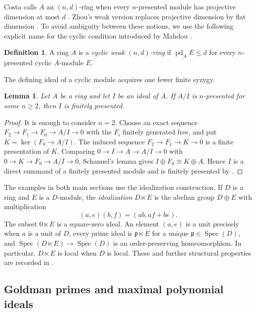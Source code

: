 \documentclass[11pt]{amsart}
\numberwithin{equation}{section}
\newtheorem{lemma}[theorem]{Lemma}
\theoremstyle{definition}
\newtheorem{definition}[theorem]{Definition}
\theoremstyle{remark}
\newcommand{\pd}{\operatorname{pd}}
\newcommand{\Spec}{\operatorname{Spec}}
\begin{document}
Costa calls $A$ an $(n,d)$-ring when every $n$-presented module has projective dimension at most $d$ \cite{Costa}.  Zhou's weak version replaces projective dimension by flat dimension \cite{Zhou}.  To avoid ambiguity between these notions, we use the following explicit name for the cyclic condition introduced by Mahdou \cite{Mahdou}.

\begin{definition}\label{def:cyclic-weak}
A ring $A$ is a \emph{cyclic weak $(n,d)$-ring} if $\pd_A E\leq d$ for every $n$-presented cyclic $A$-module $E$.
\end{definition}

The defining ideal of a cyclic module acquires one fewer finite syzygy.

\begin{lemma}\label{lem:cyclic-ideal}
Let $A$ be a ring and let $I$ be an ideal of $A$.  If $A/I$ is $n$-presented for some $n\geq2$, then $I$ is finitely presented.
\end{lemma}

\begin{proof}
It is enough to consider $n=2$.  Choose an exact sequence $F_2\to F_1\to F_0\to A/I\to0$ with the $F_i$ finitely generated free, and put $K=\ker(F_0\to A/I)$.  The induced sequence $F_2\to F_1\to K\to0$ is a finite presentation of $K$.  Comparing $0\to I\to A\to A/I\to0$ with $0\to K\to F_0\to A/I\to0$, Schanuel's lemma gives $I\oplus F_0\cong K\oplus A$.  Hence $I$ is a direct summand of a finitely presented module and is finitely presented by \cite[Theorem 2.6.5]{WK24}.
\end{proof}

The examples in both main sections use the idealization construction.  If $D$ is a ring and $E$ is a $D$-module, the \emph{idealization} $D\ltimes E$ is the abelian group $D\oplus E$ with multiplication
\[
 (a,e)(b,f)=(ab,af+be).
\]
The subset $0\ltimes E$ is a square-zero ideal.  An element $(a,e)$ is a unit precisely when $a$ is a unit of $D$, every prime ideal is $\mathfrak p\ltimes E$ for a unique $\mathfrak p\in\Spec(D)$, and $\Spec(D\ltimes E)\to\Spec(D)$ is an order-preserving homeomorphism.  In particular, $D\ltimes E$ is local when $D$ is local.  These and further structural properties are recorded in \cite{AndersonWinders, ElKKM}.

\subsection{Goldman primes and maximal polynomial ideals}
\end{document}
